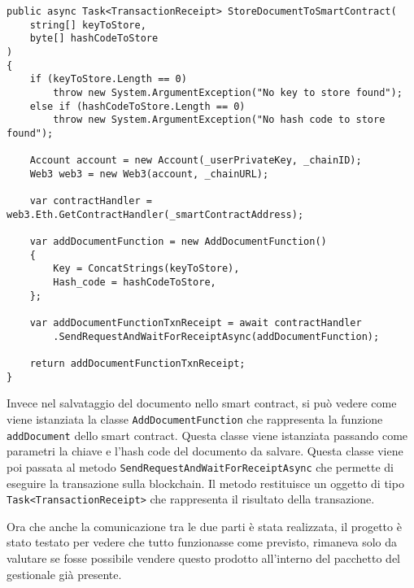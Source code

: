 \begin{lstlisting}[language=CSharp]
public async Task<TransactionReceipt> StoreDocumentToSmartContract(
    string[] keyToStore,
    byte[] hashCodeToStore
)
{
    if (keyToStore.Length == 0)
        throw new System.ArgumentException("No key to store found");
    else if (hashCodeToStore.Length == 0) 
        throw new System.ArgumentException("No hash code to store found");

    Account account = new Account(_userPrivateKey, _chainID);
    Web3 web3 = new Web3(account, _chainURL);

    var contractHandler = web3.Eth.GetContractHandler(_smartContractAddress);

    var addDocumentFunction = new AddDocumentFunction()
    {
        Key = ConcatStrings(keyToStore),
        Hash_code = hashCodeToStore,
    };

    var addDocumentFunctionTxnReceipt = await contractHandler
        .SendRequestAndWaitForReceiptAsync(addDocumentFunction);

    return addDocumentFunctionTxnReceipt;
}\end{lstlisting}

Invece nel salvataggio del documento nello smart contract, si può vedere come
viene istanziata la classe \texttt{AddDocumentFunction} che rappresenta la
funzione \texttt{addDocument} dello smart contract. Questa classe viene
istanziata passando come parametri la chiave e l'hash code del documento da
salvare. Questa classe viene poi passata al metodo
\texttt{SendRequestAndWaitForReceiptAsync} che permette di eseguire la
transazione sulla blockchain. Il metodo restituisce un oggetto di tipo
\texttt{Task<TransactionReceipt>} che rappresenta il risultato della
transazione.

Ora che anche la comunicazione tra le due parti è stata realizzata,
il progetto è stato testato per vedere che tutto funzionasse come previsto, 
rimaneva solo da valutare se fosse possibile vendere questo prodotto 
all'interno del pacchetto del gestionale già presente.
